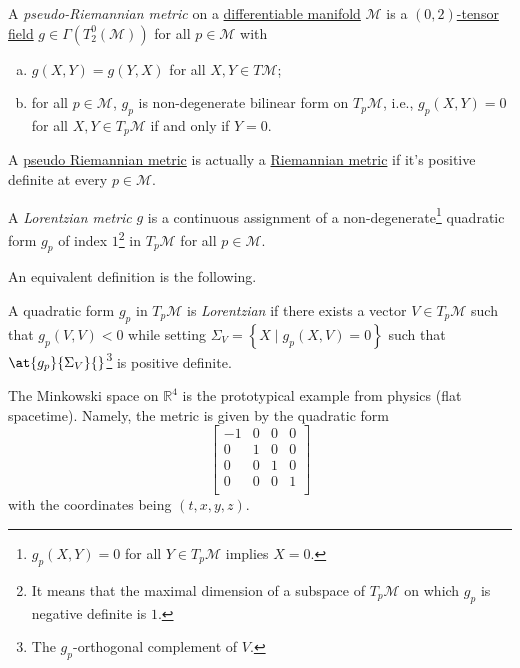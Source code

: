 \begin{definition}\label{def:pseudo-Riemannian-metric}
	A \emph{pseudo-Riemannian metric} on a \hyperref[def:smooth-manifold]{differentiable manifold} \(\mathcal{M} \) is a \hyperref[def:tensor-field]{\((0, 2)\)-tensor field} \(g\in \Gamma (T_2^0 (\mathcal{M}) )\) for all \(p\in \mathcal{M} \) with
	\begin{enumerate}[(a)]
		\item \(g(X, Y) = g(Y, X)\) for all \(X, Y\in T \mathcal{M} \);
		\item for all \(p\in \mathcal{M} \), \(g_p\) is non-degenerate bilinear form on \(T_p \mathcal{M} \), i.e., \(g_p(X, Y) = 0\) for all \(X, Y\in T_p \mathcal{M} \) if and only if \(Y = 0\).
	\end{enumerate}
\end{definition}

\begin{note}
	A \hyperref[def:pseudo-Riemannian-metric]{pseudo Riemannian metric} is actually a \hyperref[def:Riemannian-metric]{Riemannian metric} if it's positive definite at every \(p\in \mathcal{M} \).
\end{note}

\begin{definition}\label{def:Lorentzian-metric}
	A \emph{Lorentzian metric} \(g\) is a continuous assignment of a non-degenerate\footnote{\(g_p(X, Y) = 0\) for all \(Y\in T_p \mathcal{M} \) implies \(X = 0\).} quadratic form \(g_p\) of index \(1\)\footnote{It means that the maximal dimension of a subspace of \(T_p \mathcal{M} \) on which \(g_p\) is negative definite is \(1\).} in \(T_p \mathcal{M} \) for all \(p\in \mathcal{M} \).
\end{definition}

An equivalent definition is the following.

\begin{definition}[Lorentzian]\label{def:Lorentzian}
	A quadratic form \(g_p\) in \(T_{p} \mathcal{M} \) is \emph{Lorentzian} if there exists a vector \(V\in T_p \mathcal{M} \) such that \(g_p(V, V) < 0\) while setting \(\Sigma _V = \left\{ X \mid g_p(X, V) = 0 \right\}\) such that \(\at{g_p}{\Sigma _V}{} \)\footnote{The \(g_p\)-orthogonal complement of \(V\).} is positive definite.
\end{definition}

\begin{eg}
	The Minkowski space on \(\mathbb{R} ^4\) is the prototypical example from physics (flat spacetime). Namely, the metric is given by the quadratic form
	\[
		\begin{bmatrix}
			-1 & 0 & 0 & 0 \\
			0  & 1 & 0 & 0 \\
			0  & 0 & 1 & 0 \\
			0  & 0 & 0 & 1 \\
		\end{bmatrix}
	\]
	with the coordinates being \((t, x, y, z)\).
\end{eg}

